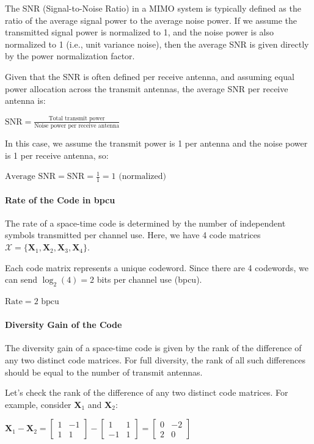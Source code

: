 \documentclass[11pt]{article}
\begin{document}
The SNR (Signal-to-Noise Ratio) in a MIMO system is typically defined as
the ratio of the average signal power to the average noise power. If we
assume the transmitted signal power is normalized to 1, and the noise
power is also normalized to 1 (i.e., unit variance noise), then the
average SNR is given directly by the power normalization factor.

Given that the SNR is often defined per receive antenna, and assuming
equal power allocation across the transmit antennas, the average SNR per
receive antenna is:

\(\text{SNR} = \frac{\text{Total transmit power}}{\text{Noise power per receive antenna}}\)

In this case, we assume the transmit power is 1 per antenna and the
noise power is 1 per receive antenna, so:

\(\text{Average SNR} = \text{SNR} = \frac{1}{1} = 1 \text{ (normalized)}\)

\paragraph{Rate of the Code in bpcu}\label{rate-of-the-code-in-bpcu}

The rate of a space-time code is determined by the number of independent
symbols transmitted per channel use. Here, we have 4 code matrices
\(\mathcal{X} = \{\mathbf{X}_1, \mathbf{X}_2, \mathbf{X}_3, \mathbf{X}_4\}\).

Each code matrix represents a unique codeword. Since there are 4
codewords, we can send \(\log_2(4) = 2\) bits per channel use (bpcu).

\(\text{Rate} = 2 \text{ bpcu}\)

\paragraph{Diversity Gain of the Code}\label{diversity-gain-of-the-code}

The diversity gain of a space-time code is given by the rank of the
difference of any two distinct code matrices. For full diversity, the
rank of all such differences should be equal to the number of transmit
antennas.

Let's check the rank of the difference of any two distinct code
matrices. For example, consider \(\mathbf{X}_1\) and \(\mathbf{X}_2\):

\(\mathbf{X}_1 - \mathbf{X}_2 = \begin{bmatrix} 1 & -1 \\ 1 & 1 \end{bmatrix} - \begin{bmatrix} 1 & 1 \\ -1 & 1 \end{bmatrix} = \begin{bmatrix} 0 & -2 \\ 2 & 0 \end{bmatrix}\)
\end{document}
